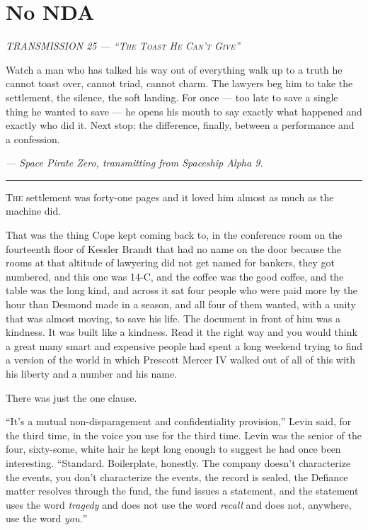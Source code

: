 \documentclass[11pt,openany]{book}
\newcommand{\transheader}{\normalfont\footnotesize\scshape\letterspace}
\newcommand{\letterspace}{}
\newenvironment{transmission}{%
  \par\vspace{0.3\baselineskip}\begin{center}\begin{minipage}{0.88\textwidth}%
  \itshape\small\setlength{\parindent}{0pt}\setstretch{1.06}}%
  {\end{minipage}\end{center}\vspace{0.4\baselineskip}%
  \noindent\hfil\rule{0.35\textwidth}{0.3pt}\hfil\par\vspace{1.0\baselineskip}}
\begin{document}
\clearpage
\chapter{No NDA}

\begin{transmission}
{\transheader TRANSMISSION 25 --- ``The Toast He Can't Give''}\par\vspace{0.5em}
Watch a man who has talked his way out of everything walk up to a truth he cannot toast over, cannot triad, cannot charm. The lawyers beg him to take the settlement, the silence, the soft landing. For once --- too late to save a single thing he wanted to save --- he opens his mouth to say exactly what happened and exactly who did it. Next stop: the difference, finally, between a performance and a confession.\par
\vspace{0.5em}\hfill\textit{--- Space Pirate Zero, transmitting from Spaceship Alpha 9.}\par
\end{transmission}


\lettrine[lines=3, lhang=0.05, nindent=0.25em]{T}{he} settlement was forty-one pages and it loved him almost as much as the machine did.

That was the thing Cope kept coming back to, in the conference room on the fourteenth floor of Kessler Brandt that had no name on the door because the rooms at that altitude of lawyering did not get named for bankers, they got numbered, and this one was 14-C, and the coffee was the good coffee, and the table was the long kind, and across it sat four people who were paid more by the hour than Desmond made in a season, and all four of them wanted, with a unity that was almost moving, to save his life. The document in front of him was a kindness. It was built like a kindness. Read it the right way and you would think a great many smart and expensive people had spent a long weekend trying to find a version of the world in which Prescott Mercer IV walked out of all of this with his liberty and a number and his name.

There was just the one clause.

``It's a mutual non-disparagement and confidentiality provision,'' Levin said, for the third time, in the voice you use for the third time. Levin was the senior of the four, sixty-some, white hair he kept long enough to suggest he had once been interesting. ``Standard. Boilerplate, honestly. The company doesn't characterize the events, you don't characterize the events, the record is sealed, the Defiance matter resolves through the fund, the fund issues a statement, and the statement uses the word \textit{tragedy} and does not use the word \textit{recall} and does not, anywhere, use the word \textit{you.}''
\end{document}
